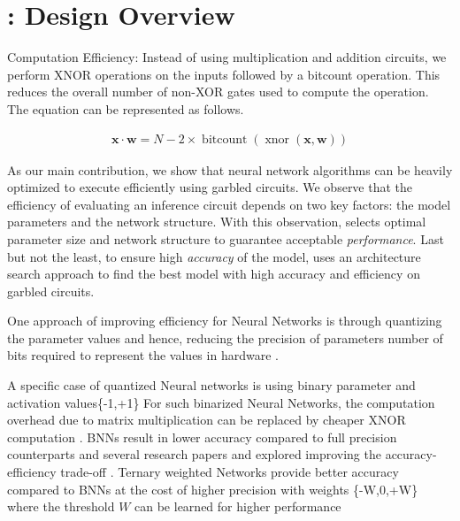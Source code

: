 \section{\method: Design Overview}\label{design}






Computation Efficiency:
Instead of using multiplication and addition circuits, we perform XNOR operations on the inputs followed by a bitcount operation. This reduces the overall number of non-XOR gates used to compute the operation. The equation can be represented as follows.

\begin{align}
\mathbf{x} \cdot \mathbf{w} =
N - 2\times\operatorname{bitcount}(\operatorname{xnor}(\mathbf{x}, \mathbf{w}))
\end{align}

As our main contribution, we show that neural network algorithms can be heavily optimized to execute efficiently using garbled circuits. We observe that the efficiency of evaluating an inference circuit depends on two key factors: the model parameters and the network structure.  With this observation,  selects optimal parameter size and network structure to guarantee acceptable {\em performance}. Last but not the least, to ensure high {\em accuracy} of the model,  uses an architecture search approach to find the best model with high accuracy and efficiency on garbled circuits.

One approach of improving efficiency for Neural Networks is through quantizing the parameter values and hence, reducing the precision of parameters number of bits required to represent the values in hardware \cite{Hubara:2017:QNN:3122009.3242044}.

A specific case of quantized Neural networks is using binary parameter and activation values\{-1,+1\} \cite{NIPS2016_6573}\cite{NIPS2015_5647}
For such binarized Neural Networks, the computation overhead due to matrix multiplication can be replaced by cheaper XNOR computation \cite{rastegari2016xnornet}\cite{DBLP:journals/corr/ZhouNZWWZ16}.
BNNs result in lower accuracy compared to full precision counterparts and several research papers and explored improving the accuracy-efficiency trade-off \cite{AAAI1714619}.
Ternary weighted Networks provide better accuracy compared to BNNs at the cost of higher precision with weights \{-W,0,+W\} where the threshold $W$ can be learned for higher performance \cite{DBLP:journals/corr/ZhuHMD16}\cite{Li2016TernaryWN}

